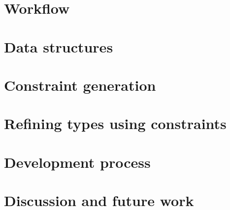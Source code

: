 \documentclass[a4paper]{article}
\begin{document}
\section{Workflow}


\section{Data structures}


\section{Constraint generation}

\section{Refining types using constraints}

\section{Development process}


\section{Discussion and future work}

\end{document}
